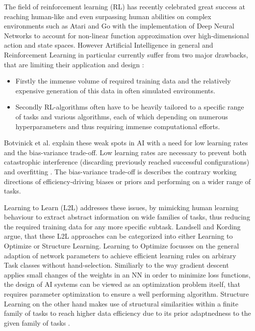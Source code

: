 \documentclass[letterpaper, 10 pt, conference]{ieeeconf}  %
\begin{document}
The field of reinforcement learning (RL) has recently celebrated great success at reaching human-like and even surpassing human abilities on
complex environments such as Atari \cite{mnihAsynchronousMethodsDeep2016} and Go \cite{silverMasteringGameGo2016} with the implementation 
of Deep Neural Networks to 
account for non-linear function approximation over high-dimensional action and state spaces. However Artificial Intelligence in general 
\cite{lansdellLearningtolearn2018} and Reinforcement Learning in particular \cite{duanRLFastReinforcement2016} currently
suffer from two major drawbacks, 
that are limiting their application and design \cite{wangLearningReinforcementLearn2016}:
\begin{itemize}
        \item Firstly the immense volume of required training data and the relatively expensive generation of this data in often simulated
        environments.
        \item Secondly RL-algorithms often have to be heavily tailored to a specific range of tasks and various algorithms, each of which
        depending on numerous hyperparameters and thus requiring immense computational efforts.
\end{itemize}        

Botvinick et al. \cite{botvinickReinforcementLearningFast2019} explain these weak spots in AI with a need for low 
learning rates and the bias-variance trade-off.
Low learning rates are necessary to prevent both catastrophic interference (discarding previously reached successful
configurations) and overfitting \cite{hardtTrainFasterGeneralize2015}. The bias-variance trade-off is describes the contrary 
working directions of efficiency-driving biases or priors and performing on a wider range of tasks. \newline

Learning to Learn (L2L) addresses these issues, by mimicking human learning behaviour to extract abstract information on wide
families of tasks, thus reducing the required training data for any more specific subtask. Landsell and
Kording\cite{lansdellLearningtolearn2018} argue, 
that these L2L approaches can be categorized into 
either Learning to Optimize or Structure Learning. Learning to Optimize focusses on the general 
adaption of network parameters to achieve efficient learning rules on arbirary Task classes without hand-selection. Similiarly to the way
gradient descent applies small changes of the weights in an NN in order to minimize loss functions, the design of AI systems can be viewed as
an optimization problem itself, that requires parameter optimization to ensure a well performing algorithm. Structure Learning 
on the other hand makes use of structural similarities within a finite family of tasks to reach higher data
efficiency due to its prior adaptnedness to the given family of tasks \cite{lansdellLearningtolearn2018}. \newline
\end{document}
